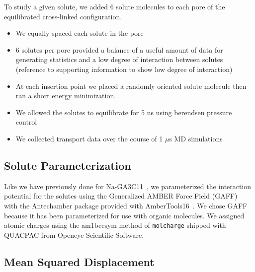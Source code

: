 \documentclass{article}
\begin{document}
  \noindent To study a given solute, we added 6 solute molecules to each pore of the
  equilibrated cross-linked configuration.
  \begin{itemize}
	\item We equally spaced each solute in the pore
	\item 6 solutes per pore provided a balance of a useful amount of data
	for generating statistics and a low degree of interaction between solutes (reference
	to supporting information to show low degree of interaction)
	\item At each insertion point we placed a randomly oriented solute molecule
	then ran a short energy minimization.
	\item We allowed the solutes to equilibrate for 5 ns using berendsen 
	pressure control
	\item We collected transport data over the course of 1 $\mu$s MD simulations
  \end{itemize}
  
  \subsection*{Solute Parameterization}\label{method:parameterization}
  
  Like we have previously done for Na-GA3C11~\cite{coscia_understanding_2019}, we
  parameterized the interaction potential for the solutes using the Generalized 
  AMBER Force Field (GAFF)~\cite{wang_development_2004} with the Antechamber package
  \cite{wang_automatic_2006} provided with AmberTools16~\cite{case_ambertools16_2016}.
  We chose GAFF because it has been parameterized for use with organic molecules. We
  assigned atomic charges using the am1bccsym method of \texttt{molcharge} shipped
  with QUACPAC from Openeye Scientific Software.
  
  \subsection*{Mean Squared Displacement}\label{method:MSD}
\end{document}
